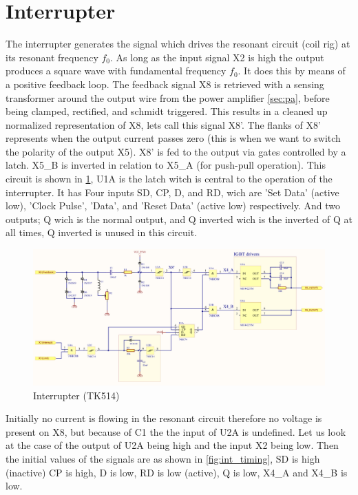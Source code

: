 \newpage
\section{Interrupter}
\label{sec:interrupter}

The interrupter generates the signal which drives the resonant circuit (coil rig) at its resonant frequency $f_0$. As long as the input signal X2 is high the output produces a square wave with fundamental frequency $f_0$. It does this by means of a positive feedback loop. The feedback signal X8 is retrieved with a sensing transformer around the output wire from the power amplifier \cref{sec:pa}, before being clamped, rectified, and schmidt triggered. This results in a cleaned up normalized representation of X8, lets call this signal X8'. The flanks of X8' represents when the output current passes zero (this is when we want to switch the polarity of the output X5). X8' is fed to the output via gates controlled by a latch. X5\_B is inverted in relation to X5\_A (for push-pull operation). This circuit is shown in \cref{fig:interrupter}, U1A is the latch witch is central to the operation of the interrupter. It has Four inputs SD, CP, D, and RD, wich are 'Set Data' (active low), 'Clock Pulse', 'Data', and 'Reset Data' (active low) respectively. And two outputs; Q wich is the normal output, and Q inverted wich is the inverted of Q at all times, Q inverted is unused in this circuit.

\begin{figure}[H]
    \centering
    \includegraphics[width=0.9\textheight,angle=-90]{Skjema/TK514_Interrupter.pdf}
    \caption{Interrupter (TK514)}
    \label{fig:interrupter}
\end{figure}

\newpage

Initially no current is flowing in the resonant circuit therefore no voltage is present on X8, but because of C1 the the input of U2A is undefined. Let us look at the case of the output of U2A being high and the input X2 being low. Then the initial values of the signals are as shown in \cref{fig:int_timing}, SD is high (inactive) CP is high, D is low, RD is low (active), Q is low, X4\_A and X4\_B is low.

